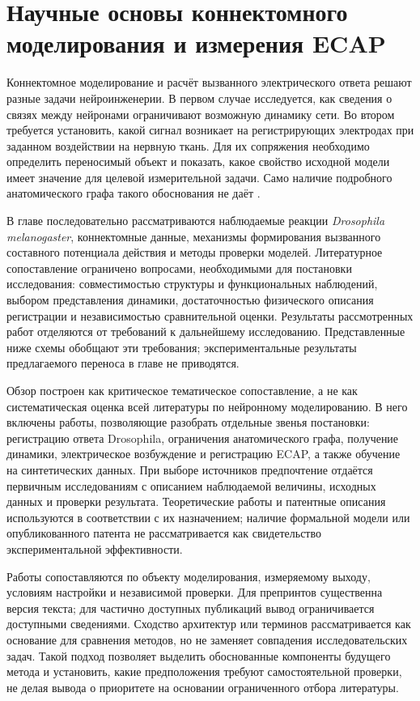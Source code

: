 \chapter{Научные основы коннектомного моделирования и измерения ECAP}
\label{chap:foundations}

Коннектомное моделирование и расчёт вызванного электрического ответа решают разные задачи нейроинженерии. В первом случае исследуется, как сведения о связях между нейронами ограничивают возможную динамику сети. Во втором требуется установить, какой сигнал возникает на регистрирующих электродах при заданном воздействии на нервную ткань. Для их сопряжения необходимо определить переносимый объект и показать, какое свойство исходной модели имеет значение для целевой измерительной задачи. Само наличие подробного анатомического графа такого обоснования не даёт \cite{s743,s285}.

В главе последовательно рассматриваются наблюдаемые реакции \textit{Drosophila melanogaster}, коннектомные данные, механизмы формирования вызванного составного потенциала действия и методы проверки моделей. Литературное сопоставление ограничено вопросами, необходимыми для постановки исследования: совместимостью структуры и функциональных наблюдений, выбором представления динамики, достаточностью физического описания регистрации и независимостью сравнительной оценки. Результаты рассмотренных работ отделяются от требований к дальнейшему исследованию. Представленные ниже схемы обобщают эти требования; экспериментальные результаты предлагаемого переноса в главе не приводятся.

Обзор построен как критическое тематическое сопоставление, а не как систематическая оценка всей литературы по нейронному моделированию. В него включены работы, позволяющие разобрать отдельные звенья постановки: регистрацию ответа Drosophila, ограничения анатомического графа, получение динамики, электрическое возбуждение и регистрацию ECAP, а также обучение на синтетических данных. При выборе источников предпочтение отдаётся первичным исследованиям с описанием наблюдаемой величины, исходных данных и проверки результата. Теоретические работы и патентные описания используются в соответствии с их назначением; наличие формальной модели или опубликованного патента не рассматривается как свидетельство экспериментальной эффективности.

Работы сопоставляются по объекту моделирования, измеряемому выходу, условиям настройки и независимой проверки. Для препринтов существенна версия текста; для частично доступных публикаций вывод ограничивается доступными сведениями. Сходство архитектур или терминов рассматривается как основание для сравнения методов, но не заменяет совпадения исследовательских задач. Такой подход позволяет выделить обоснованные компоненты будущего метода и установить, какие предположения требуют самостоятельной проверки, не делая вывода о приоритете на основании ограниченного отбора литературы.

